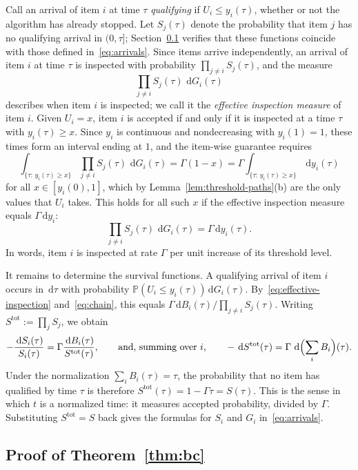 \documentclass[11pt]{article}
\theoremstyle{definition}
\theoremstyle{remark}
\newcommand{\Pp}{\mathbb P}
\newcommand{\dd}{\,\mathrm d}
\begin{document}
Call an arrival of item $i$ at time $\tau$ \emph{qualifying} if $U_i\le y_i(\tau)$, whether or not the algorithm has already stopped.
Let $S_j(\tau)$ denote the probability that item $j$ has no qualifying arrival in $(0,\tau]$; Section~\ref{app:bc-proof} verifies that these functions coincide with those defined in~\eqref{eq:arrivals}.
Since items arrive independently, an arrival of item $i$ at time $\tau$ is inspected with probability $\prod_{j\ne i}S_j(\tau)$, and the measure
\[
 \prod_{j\ne i}S_j(\tau)\,\dd G_i(\tau)
\]
describes when item $i$ is inspected; we call it the \emph{effective inspection measure} of item $i$.
Given $U_i=x$, item $i$ is accepted if and only if it is inspected at a time $\tau$ with $y_i(\tau)\ge x$.
Since $y_i$ is continuous and nondecreasing with $y_i(1)=1$, these times form an interval ending at $1$, and the item-wise guarantee requires
\[
 \int_{\{\tau:\,y_i(\tau)\ge x\}}\prod_{j\ne i}S_j(\tau)\,\dd G_i(\tau)
 =\Gamma(1-x)
 =\Gamma\int_{\{\tau:\,y_i(\tau)\ge x\}}\dd y_i(\tau)
\]
for all $x\in[y_i(0),1]$, which by Lemma~\ref{lem:threshold-paths}(b) are the only values that $U_i$ takes.
This holds for all such $x$ if the effective inspection measure equals $\Gamma\dd y_i$:
\begin{equation}\label{eq:effective-inspection}
 \prod_{j\ne i}S_j(\tau)\,\dd G_i(\tau)=\Gamma\dd y_i(\tau).
\end{equation}
In words, item $i$ is inspected at rate $\Gamma$ per unit increase of its threshold level.

It remains to determine the survival functions.
A qualifying arrival of item $i$ occurs in $\dd\tau$ with probability $\Pp(U_i\le y_i(\tau))\dd G_i(\tau)$.
By~\eqref{eq:effective-inspection} and~\eqref{eq:chain}, this equals $\Gamma\dd B_i(\tau)/\prod_{j\ne i}S_j(\tau)$.
Writing $S^{\mathrm{tot}}:=\prod_jS_j$, we obtain
\[
 -\frac{\dd S_i(\tau)}{S_i(\tau)}=\Gamma\frac{\dd B_i(\tau)}{S^{\mathrm{tot}}(\tau)},
 \qquad\text{and, summing over $i$,}\qquad
 -\dd S^{\mathrm{tot}}(\tau)=\Gamma\,\dd\Bigl(\sum_iB_i\Bigr)(\tau).
\]
Under the normalization $\sum_iB_i(\tau)=\tau$, the probability that no item has qualified by time $\tau$ is therefore $S^{\mathrm{tot}}(\tau)=1-\Gamma\tau=S(\tau)$.
This is the sense in which $t$ is a normalized time: it measures accepted probability, divided by $\Gamma$.
Substituting $S^{\mathrm{tot}}=S$ back gives the formulas for $S_i$ and $G_i$ in~\eqref{eq:arrivals}.

\subsection{Proof of Theorem~\ref{thm:bc}}\label{app:bc-proof}
\end{document}
